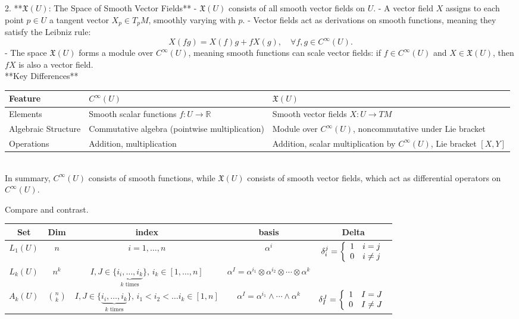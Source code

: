 \documentclass[10pt,a4paper]{report}
\begin{document}
2. **\( \mathfrak{X}(U) \): The Space of Smooth Vector Fields**
   - \( \mathfrak{X}(U) \) consists of all smooth vector fields on \( U \).
   - A vector field \( X \) assigns to each point \( p \in U \) a tangent vector \( X_p \in T_pM \), smoothly varying with \( p \).
   - Vector fields act as derivations on smooth functions, meaning they satisfy the Leibniz rule:
     \[
     X(fg) = X(f) g + f X(g), \quad \forall f,g \in C^\infty(U).
     \]
   - The space \( \mathfrak{X}(U) \) forms a module over \( C^\infty(U) \), meaning smooth functions can scale vector fields: if \( f \in C^\infty(U) \) and \( X \in \mathfrak{X}(U) \), then \( fX \) is also a vector field.\\

**Key Differences**\\

\begin{tabular}{|l|l|p{6cm}|}
	\hline
	Feature & \( C^\infty(U) \) & \( \mathfrak{X}(U) \) \\
	\hline
	Elements & Smooth scalar functions \( f: U \to \mathbb{R} \) & Smooth vector fields \( X: U \to TM \) \\
	\hline
	Algebraic Structure & Commutative algebra (pointwise multiplication) & Module over \( C^\infty(U) \), noncommutative under Lie bracket \\
	\hline
	Operations & Addition, multiplication & Addition, scalar multiplication by \( C^\infty(U) \), Lie bracket \([X, Y]\) \\
	\hline
\end{tabular}\\

In summary, \( C^\infty(U) \) consists of smooth functions, while \( \mathfrak{X}(U) \) consists of smooth vector fields, which act as differential operators on \( C^\infty(U) \).

\newpage
Compare and contrast.\\

\begin{tabular}{|c|c|c|c|c|}
	\hline
	Set & Dim & index & basis & Delta \\
	\hline
	$L_1(U)$ &$n$& $i = 1,\dots, n$ & $\alpha^i$ & $\delta_i^j = \left \{ \begin{array}{ll} 1 & i=j\\ 0& i \ne j \end{array} \right .$\\
	$L_k(U)$& $n^k$& $I,J \in \{ \underbrace{ i_i, \dots, i_k}_{k\text{ times}}\}, \, i_k\in[1,\dots, n]$ & $\alpha^I = \alpha^{i_1}\otimes\alpha^{i_2}\otimes\cdots\otimes\alpha^{k}$ & \\
	$A_k(U)$ &$\binom{n}{k}$& $I,J \in \{ \underbrace{ i_i, \dots, i_k}_{k\text{ times}}\}, \, i_1<i_2<\dots i_k \in [1, n]$ & $\alpha^I = \alpha^{i_1}\wedge\cdots\wedge\alpha^k$ & $\delta_I^J =\left \{ \begin{array}{ll} 1 & I=J\\ 0& I \ne J \end{array} \right .$ \\	\hline 
\end{tabular}\\
\end{document}
